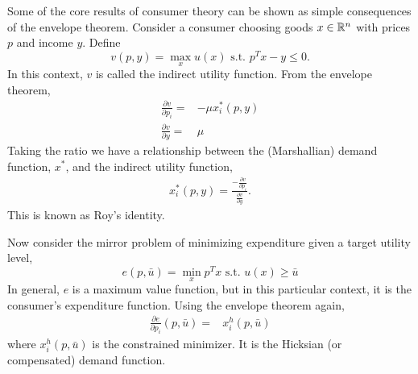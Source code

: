 \begin{example}
  Some of the core results of consumer theory can be shown as simple
  consequences of the envelope theorem. Consider a consumer choosing
  goods $x \in \mathbb{R}^n$ with prices $p$ and income $y$. Define 
  \[ v(p,y) = \max_x u(x) \text{ s.t. } p^T x - y \leq 0. \]
  In this context, $v$ is called the indirect utility function. From
  the envelope theorem,
  \begin{align*}
    \frac{\partial v}{\partial p_i} = & -\mu x_i^*(p,y) \\
    \frac{\partial v}{\partial y} = & \mu
  \end{align*}
  Taking the ratio we have a relationship between the (Marshallian)
  demand function, $x^*$, and the indirect utility function,
  \begin{align*}
    x_i^*(p,y) = \frac{ -\frac{\partial v}{\partial p_i}}
    {\frac{\partial v}{\partial y}}.
  \end{align*}
  This is known as Roy's identity.

  Now consider the mirror problem of minimizing expenditure given a
  target utility level,
  \[ e(p,\bar{u}) = \min_x p^T x \text{ s.t. } u(x) \geq \bar{u} \]
  In general, $e$ is a maximum value function, but in this particular
  context, it is the consumer's expenditure function. Using the
  envelope theorem again,
  \begin{align*}
    \frac{\partial e}{\partial p_i}(p,\bar{u}) = & x_i^h(p,\bar{u})
  \end{align*}
  where $x_i^h(p,\bar{u})$ is the constrained minimizer. It is the
  Hicksian (or compensated) demand function.


\end{example}

